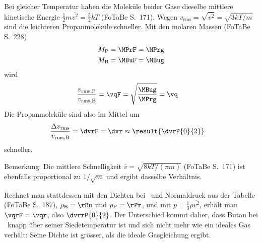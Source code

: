 Bei gleicher Temperatur haben die Moleküle beider Gase dieselbe mittlere kinetische Energie $\frac{1}{2}m\overline{v^2} = \frac{3}{2}kT$ (FoTaBe S.~171). Wegen $v_\text{rms} = \sqrt{\overline{v^2}} = \sqrt{3kT/m}$ sind die leichteren Propanmoleküle schneller. Mit den molaren Massen (FoTaBe S.~228)
\begin{align}
 M_\text{P} &= \MPrF = \MPrg \\
 M_\text{B} &= \MBuF = \MBug
\end{align}
wird
\begin{align}
 \frac{v_\text{rms,P}}{v_\text{rms,B}} &= \vqF = \sqrt{\frac{\MBug}{\MPrg}} = \vq
\end{align}
Die Propanmoleküle sind also im Mittel um
\begin{align}
 \frac{\Delta v_\text{rms}}{v_\text{rms,B}} &= \dvrF = \dvr \approx \result{\dvrP{0}{2}}
\end{align}
schneller.

Bemerkung: Die mittlere Schnelligkeit $\bar v = \sqrt{8kT/(\pi m)}$ (FoTaBe S.~171) ist ebenfalls proportional zu $1/\sqrt{m}$ und ergibt dasselbe Verhältnis.

Rechnet man stattdessen mit den Dichten bei \thNO\ und Normaldruck aus der Tabelle (FoTaBe S.~187), $\rho_\text{B} = \rBu$ und $\rho_\text{P} = \rPr$, und mit $p = \frac{1}{3}\rho\overline{v^2}$, erhält man $\vqrF = \vqr$, also $\dvrrP{0}{2}$. Der Unterschied kommt daher, dass Butan bei \thNO\ knapp über seiner Siedetemperatur ist und sich nicht mehr wie ein ideales Gas verhält: Seine Dichte ist grösser, als die ideale Gasgleichung ergibt.
